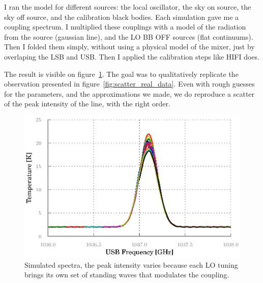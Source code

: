 \documentclass[a4paper,11pt]{article}
\begin{document}
I ran the model for different sources: the local oscillator, the sky on source, the sky off source, and the calibration black bodies.
Each simulation gave me a coupling spectrum.
I multiplied these couplings with a model of the radiation from the source (gaussian line), and the LO BB OFF sources (flat continuums).
Then I folded them simply, without using a physical model of the mixer, just by overlaping the LSB and USB.
Then I applied the calibration steps like HIFI does.

The result is visible on figure~\ref{fig:simulated_spectrum_dirty}.
The goal was to qualitatively replicate the observation presented in figure~\ref{fig:scatter_real_data}.
Even with rough guesses for the parameters, and the approximations we made, we do reproduce a scatter of the peak intensity of the line, with the right order.
\begin{figure}
    \centering
    \includegraphics{bb-on_narrow}
    \caption{\label{fig:simulated_spectrum_dirty}Simulated spectra, the peak intensity varies because each LO tuning brings its own set of standing waves that modulates the coupling.}
\end{figure}
\end{document}
